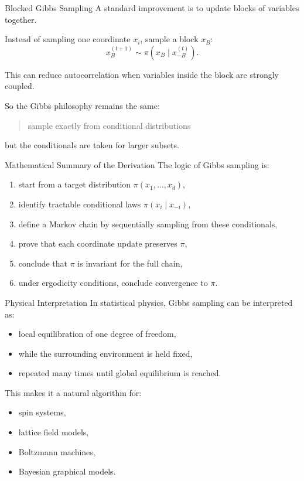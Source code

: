 \documentclass[aspectratio=169]{beamer}
\begin{document}
\begin{frame}{Blocked Gibbs Sampling}
A standard improvement is to update blocks of variables together.

Instead of sampling one coordinate \(x_i\), sample a block \(x_B\):
\[
x_B^{(t+1)} \sim \pi(x_B \mid x_{-B}^{(t)}).
\]

This can reduce autocorrelation when variables inside the block are strongly coupled.

\medskip

So the Gibbs philosophy remains the same:
\begin{quote}
sample exactly from conditional distributions
\end{quote}
but the conditionals are taken for larger subsets.
\end{frame}

\begin{frame}{Mathematical Summary of the Derivation}
The logic of Gibbs sampling is:
\begin{enumerate}
    \item start from a target distribution \(\pi(x_1,\dots,x_d)\),
    \item identify tractable conditional laws \(\pi(x_i\mid x_{-i})\),
    \item define a Markov chain by sequentially sampling from these conditionals,
    \item prove that each coordinate update preserves \(\pi\),
    \item conclude that \(\pi\) is invariant for the full chain,
    \item under ergodicity conditions, conclude convergence to \(\pi\).
\end{enumerate}
\end{frame}

\begin{frame}{Physical Interpretation}
In statistical physics, Gibbs sampling can be interpreted as:
\begin{itemize}
    \item local equilibration of one degree of freedom,
    \item while the surrounding environment is held fixed,
    \item repeated many times until global equilibrium is reached.
\end{itemize}

This makes it a natural algorithm for:
\begin{itemize}
    \item spin systems,
    \item lattice field models,
    \item Boltzmann machines,
    \item Bayesian graphical models.
\end{itemize}
\end{frame}
\end{document}
